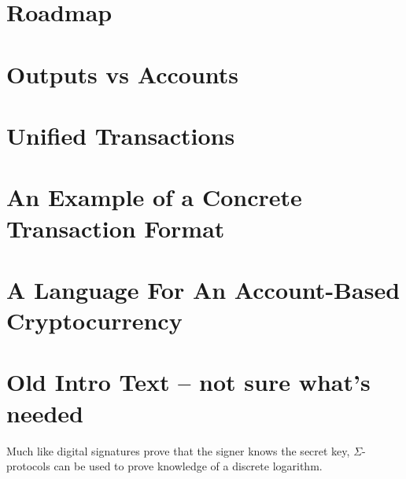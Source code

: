 \documentclass[11pt]{article}
\newcommand{\authnote}[2]{\marginpar{\parbox{\marginparwidth}{\tiny %
  \textsf{#1 {\textcolor{blue}{notes: #2}}}}}%
  \textcolor{blue}{\textbf{\dag}}}
\newcommand{\authnote}[2]{
  \textsf{#1 \textcolor{blue}{: #2}}}
\newcommand{\authnote}[2]{}
\newcommand{\knote}[1]{{\authnote{\textcolor{green}{kushti notes}}{#1}}}
\begin{document}
\section{Roadmap}

\section{Outputs vs Accounts}

\section{Unified Transactions}
\label{apx:unified}

\section{An Example of a Concrete Transaction Format}
\label{apx:tx-format}

\knote{Describe Ergo transaction format here. Malleability problems to be discussed here.}

\section{A Language For An Account-Based Cryptocurrency}
\label{apx:account}

\section{Old Intro Text -- not sure what's needed}

Much like digital signatures prove that the signer knows the secret key, $\Sigma$-protocols can be used to prove knowledge of a discrete logarithm. 
\end{document}
